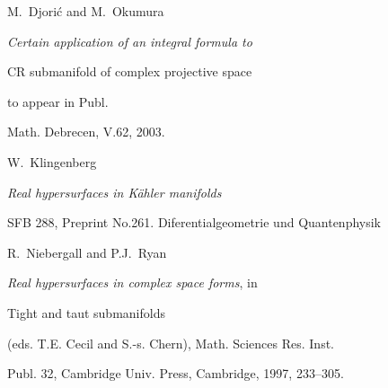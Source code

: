 \label{end}














































 M.~Djori\'c and M.~Okumura


  {\em Certain application of an integral formula to


CR submanifold of complex projective space} to appear in Publ.


Math. Debrecen, V.62, 2003.







W.~Klingenberg


 {\em Real hypersurfaces in K\"ahler manifolds}


SFB 288, Preprint No.261. Diferentialgeometrie und Quantenphysik







R.~Niebergall and P.J.~Ryan


{\em  Real hypersurfaces in complex space forms}, {\rm in}


Tight and taut submanifolds


 (eds. T.E. Cecil and S.-s. Chern), Math. Sciences Res. Inst.


Publ. 32, Cambridge Univ. Press, Cambridge,  1997, 233--305.






